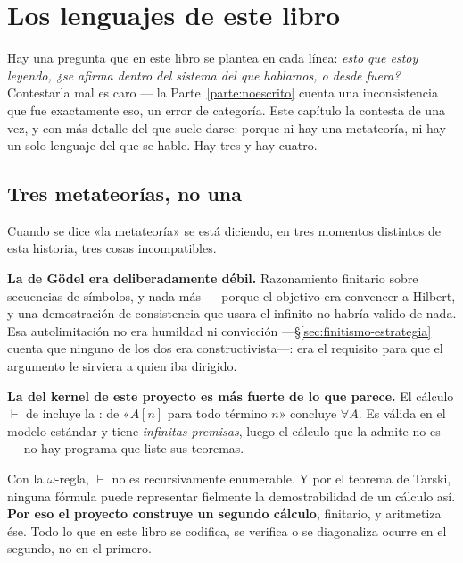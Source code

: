 \chapter{Los lenguajes de este libro}
\label{cap:lenguajes}

Hay una pregunta que en este libro se plantea en cada línea: \emph{esto que estoy leyendo,
¿se afirma dentro del sistema del que hablamos, o desde fuera?} Contestarla mal es caro — la Parte~\ref{parte:noescrito} cuenta una inconsistencia que fue exactamente
eso, un error de categoría. Este capítulo la contesta de una vez, y con más detalle del que suele
darse: porque ni hay una metateoría, ni hay un solo lenguaje del que se hable. Hay tres y hay
cuatro.

\section{Tres metateorías, no una}

Cuando se dice «la metateoría» se está diciendo, en tres momentos distintos de esta historia, tres
cosas incompatibles.

\textbf{La de Gödel era deliberadamente débil.} Razonamiento finitario sobre secuencias de símbolos,
y nada más — porque el objetivo era convencer a Hilbert, y una demostración de consistencia que
usara el infinito no habría valido de nada. Esa autolimitación no era humildad ni convicción
—§\ref{sec:finitismo-estrategia} cuenta que ninguno de los dos era constructivista—: era el
requisito para que el argumento le sirviera a quien iba dirigido.

\textbf{La del kernel de este proyecto es más fuerte de lo que parece.} El cálculo $\vdash$ de
 incluye la : de «$A[n]$ para todo término $n$» concluye
$\forall A$. Es válida en el modelo estándar y tiene \emph{infinitas premisas}, luego el cálculo que
la admite no es  — no hay programa que liste sus teoremas.

\begin{muro}
Con la $\omega$-regla, $\vdash$ no es recursivamente enumerable. Y por el teorema de Tarski, ninguna
fórmula puede representar fielmente la demostrabilidad de un cálculo así. \textbf{Por eso el
proyecto construye un segundo cálculo}, finitario, y aritmetiza ése. Todo lo que en este libro se
codifica, se verifica o se diagonaliza ocurre en el segundo, no en el primero.
\end{muro}

